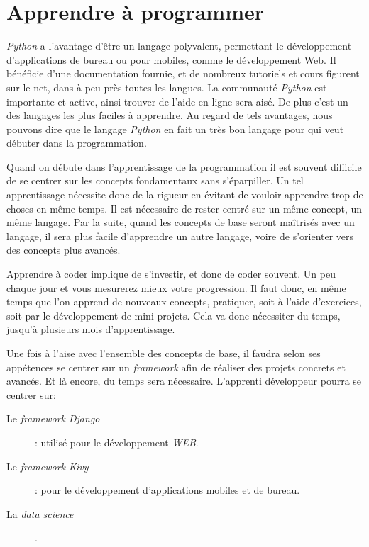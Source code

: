 \chapter{Apprendre à programmer}

\textit{Python} a l'avantage d'être un langage polyvalent, permettant le développement d'applications de bureau ou pour mobiles, comme le développement Web. Il bénéficie d'une documentation fournie, et de nombreux tutoriels et cours figurent sur le net, dans à peu près toutes les langues. La communauté \textit{Python} est importante et active, ainsi trouver de l'aide en ligne sera aisé. De plus c'est un des langages les plus faciles à apprendre. Au regard de tels avantages, nous pouvons dire que le langage \textit{Python} en fait un très bon langage pour qui veut débuter dans la programmation.
\medskip

Quand on débute dans l'apprentissage de la programmation il est souvent difficile de se centrer sur les concepts fondamentaux sans s'éparpiller. Un tel apprentissage nécessite donc de la rigueur en évitant de vouloir apprendre trop de choses en même temps. Il est nécessaire de rester centré sur un même concept, un même langage. Par la suite, quand les concepts de base seront maîtrisés avec un langage, il sera plus facile d'apprendre un autre langage, voire de s'orienter vers des concepts plus avancés.
\medskip

Apprendre à coder implique de s'investir, et donc de coder souvent. Un peu chaque jour et vous mesurerez mieux votre progression. Il faut donc, en même temps que l'on apprend de nouveaux concepts, pratiquer, soit à l'aide d'exercices, soit par le développement de mini projets. Cela va donc nécessiter du temps, jusqu'à plusieurs mois d'apprentissage.
\medskip

Une fois à l'aise avec l'ensemble des concepts de base, il faudra selon ses appétences se centrer sur un \textit{framework} afin de réaliser des projets concrets et avancés. Et là encore, du temps sera nécessaire. L'apprenti développeur pourra se centrer sur:
\begin{description}
    \item[Le \textit{framework Django}]: utilisé pour le développement \textit{WEB}.
    \item[Le \textit{framework Kivy}]: pour le développement d'applications mobiles et de bureau.
    \item[La \textit{data science}].
\end{description}

